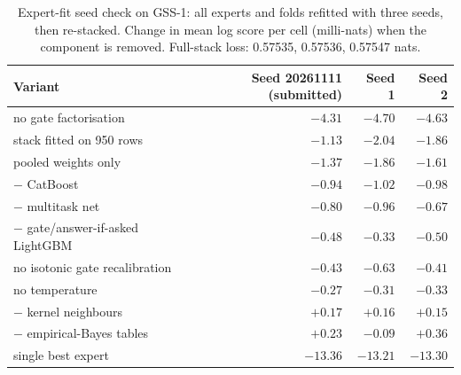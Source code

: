 \begin{table}[h]
\centering\small
\caption{Expert-fit seed check on GSS-1: all experts and folds refitted with three seeds, then re-stacked. Change in mean log score per cell (milli-nats) when the component is removed. Full-stack loss: 0.57535, 0.57536, 0.57547 nats.}
\label{tab:seeds}
\begin{tabular}{lrrr}
\toprule
Variant & Seed 20261111 (submitted) & Seed 1 & Seed 2 \\
\midrule
no gate factorisation & $-4.31$ & $-4.70$ & $-4.63$ \\
stack fitted on 950 rows & $-1.13$ & $-2.04$ & $-1.86$ \\
pooled weights only & $-1.37$ & $-1.86$ & $-1.61$ \\
$-$ CatBoost & $-0.94$ & $-1.02$ & $-0.98$ \\
$-$ multitask net & $-0.80$ & $-0.96$ & $-0.67$ \\
$-$ gate/answer-if-asked LightGBM & $-0.48$ & $-0.33$ & $-0.50$ \\
no isotonic gate recalibration & $-0.43$ & $-0.63$ & $-0.41$ \\
no temperature & $-0.27$ & $-0.31$ & $-0.33$ \\
$-$ kernel neighbours & $+0.17$ & $+0.16$ & $+0.15$ \\
$-$ empirical-Bayes tables & $+0.23$ & $-0.09$ & $+0.36$ \\
single best expert & $-13.36$ & $-13.21$ & $-13.30$ \\
\bottomrule
\end{tabular}
\end{table}
